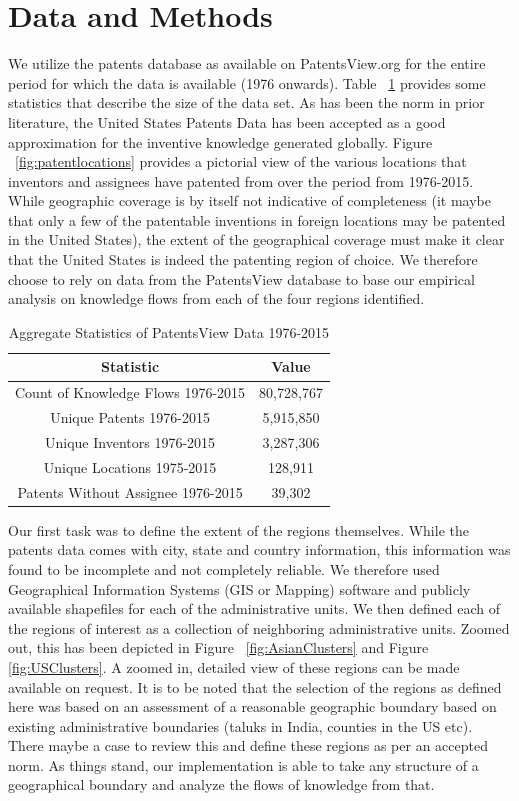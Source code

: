 \documentclass[12pt]{article}
\begin{document}
\section{Data and Methods}
We utilize the patents database as available on PatentsView.org for the entire period for which the data is available (1976 onwards).  Table ~\ref{table:aggregate} provides some statistics that describe the size of the data set. As has been the norm in prior literature, the United States Patents Data has been accepted as a good approximation for the inventive knowledge generated globally. Figure ~\ref{fig:patentlocations} provides a pictorial view of the various locations that inventors and assignees have patented from over the period from 1976-2015. While geographic coverage is by itself not indicative of completeness (it maybe that only a few of the patentable inventions in foreign locations may be patented in the United States), the extent of the geographical coverage must make it clear that the United States is indeed the patenting region of choice. We therefore choose to rely on data from the PatentsView database to base our empirical analysis on knowledge flows from each of the four regions identified.

\begin{table}
\begin{centering}
\label{table:aggregate}
\begin{tabular}{|c|c|}
\hline
Statistic&Value\\
\hline
Count of Knowledge Flows 1976-2015&80,728,767\\ \hline
Unique Patents 1976-2015&5,915,850\\ \hline
Unique Inventors 1976-2015&3,287,306\\ \hline
Unique Locations 1975-2015&128,911\\ \hline
Patents Without Assignee 1976-2015&39,302\\ \hline
\end{tabular}
\caption {Aggregate Statistics of PatentsView Data 1976-2015}
\end{centering}
\end{table}

Our first task was to define the extent of the regions themselves. While the patents data comes with city, state and country information, this information was found to be incomplete and not completely reliable. We therefore used Geographical Information Systems (GIS or Mapping) software and publicly available shapefiles for each of the administrative units. We then defined each of the regions of interest as a collection of neighboring administrative units. Zoomed out, this has been depicted in Figure ~\ref{fig:AsianClusters} and Figure \ref{fig:USClusters}. A zoomed in, detailed view of these regions can be made available on request. It is to be noted that the selection of the regions as defined here was based on an assessment of a reasonable geographic boundary based on existing administrative boundaries (taluks in India, counties in the US etc). There maybe a case to review this and define these regions as per an accepted norm. As things stand, our implementation is able to take any structure of a geographical boundary and analyze the flows of knowledge from that.
\end{document}

